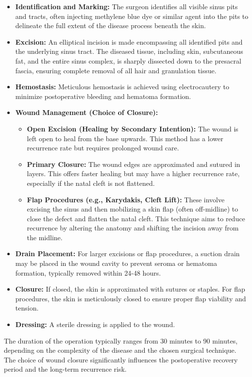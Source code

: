\begin{itemize}
  \item \textbf{Identification and Marking:} The surgeon identifies all visible sinus pits and tracts, often injecting methylene blue dye or similar agent into the pits to delineate the full extent of the disease process beneath the skin.
  \item \textbf{Excision:} An elliptical incision is made encompassing all identified pits and the underlying sinus tract. The diseased tissue, including skin, subcutaneous fat, and the entire sinus complex, is sharply dissected down to the presacral fascia, ensuring complete removal of all hair and granulation tissue.
  \item \textbf{Hemostasis:} Meticulous hemostasis is achieved using electrocautery to minimize postoperative bleeding and hematoma formation.
  \item \textbf{Wound Management (Choice of Closure):}
  \begin{itemize}
    \item \textbf{Open Excision (Healing by Secondary Intention):} The wound is left open to heal from the base upwards. This method has a lower recurrence rate but requires prolonged wound care.
    \item \textbf{Primary Closure:} The wound edges are approximated and sutured in layers. This offers faster healing but may have a higher recurrence rate, especially if the natal cleft is not flattened.
    \item \textbf{Flap Procedures (e.g., Karydakis, Cleft Lift):} These involve excising the sinus and then mobilizing a skin flap (often off-midline) to close the defect and flatten the natal cleft. This technique aims to reduce recurrence by altering the anatomy and shifting the incision away from the midline.
  \end{itemize}
  \item \textbf{Drain Placement:} For larger excisions or flap procedures, a suction drain may be placed in the wound cavity to prevent seroma or hematoma formation, typically removed within 24-48 hours.
  \item \textbf{Closure:} If closed, the skin is approximated with sutures or staples. For flap procedures, the skin is meticulously closed to ensure proper flap viability and tension.
  \item \textbf{Dressing:} A sterile dressing is applied to the wound.
\end{itemize}

The duration of the operation typically ranges from 30 minutes to 90 minutes, depending on the complexity of the disease and the chosen surgical technique. The choice of wound closure significantly influences the postoperative recovery period and the long-term recurrence risk.

